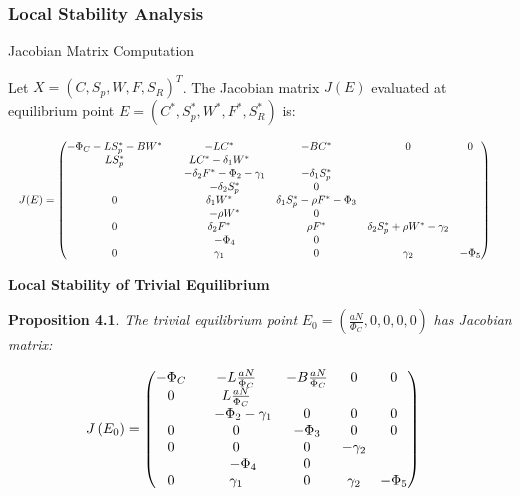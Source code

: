 \documentclass[10pt]{NSP1}
\newcommand{\fitwidth}[1]{\resizebox{\ifdim\width>\linewidth\linewidth\else\width\fi}{!}{#1}}
\begin{document}
\subsubsection{Local Stability Analysis}

Jacobian Matrix Computation

Let \(X = \left( C,S_{p},W,F,S_{R} \right)^{T}\). The Jacobian matrix \(J(E)\) evaluated at equilibrium point \(E = \left( C^{*},S_{p}^{*},W^{*},F^{*},S_{R}^{*} \right)\) is:

\[
\fitwidth{$\displaystyle \begin{aligned}
&J(E) = \begin{pmatrix}
-\Phi_{C} - LS_{p}^{*} - BW^{*} & -LC^{*} & -BC^{*} & 0 & 0 \\
LS_{p}^{*} & LC^{*} - \delta_{1}W^{*} \\
&\quad - \delta_{2}F^{*} - \Phi_{2} - \gamma_{1} & -\delta_{1}S_{p}^{*} & \\
&\quad -\delta_{2}S_{p}^{*} & 0 \\
0 & \delta_{1}W^{*} & \delta_{1}S_{p}^{*} - \rho F^{*} - \Phi_{3} & \\
&\quad -\rho W^{*} & 0 \\
0 & \delta_{2}F^{*} & \rho F^{*} & \delta_{2}S_{p}^{*} + \rho W^{*} - \gamma_{2} \\
&\quad - \Phi_{4} & 0 \\
0 & \gamma_{1} & 0 & \gamma_{2} & -\Phi_{5}
\end{pmatrix}
\end{aligned}$}
\]

\textbf{Local Stability of Trivial Equilibrium}

\textbf{Proposition 4.1}. \emph{The trivial equilibrium point} \(E_{0} = \left( \frac{aN}{\Phi_{C}},0,0,0,0 \right)\) \emph{has Jacobian matrix:}

\[
\fitwidth{$\displaystyle \begin{aligned}
&J\left( E_{0} \right) = \begin{pmatrix}
-\Phi_{C} & -L\frac{aN}{\Phi_{C}} & -B\frac{aN}{\Phi_{C}} & 0 & 0 \\
0 & L\frac{aN}{\Phi_{C}} \\
&\quad - \Phi_{2} - \gamma_{1} & 0 & 0 & 0 \\
0 & 0 & -\Phi_{3} & 0 & 0 \\
0 & 0 & 0 & -\gamma_{2} \\
&\quad - \Phi_{4} & 0 \\
0 & \gamma_{1} & 0 & \gamma_{2} & -\Phi_{5}
\end{pmatrix}
\end{aligned}$}
\]
\end{document}
